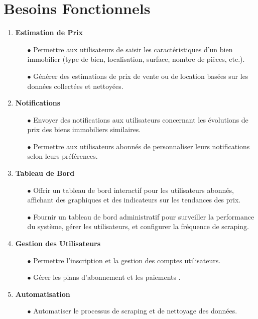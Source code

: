 \documentclass[a4paper,12pt]{report}
\numberwithin{equation}{section}
\begin{document}
\section{Besoins Fonctionnels}
\vspace{0.5cm}
\begin{enumerate}
    \item \textbf{Estimation de Prix}
    \begin{itemize}
        \item[$\bullet$] Permettre aux utilisateurs de saisir les caractéristiques d'un bien immobilier (type de bien, localisation, surface, nombre de pièces, etc.).
        \item[$\bullet$] Générer des estimations de prix de vente ou de location basées sur les données collectées et nettoyées.
    \end{itemize}
    \newpage
    \item \textbf{Notifications}
    \begin{itemize}
        \item[$\bullet$] Envoyer des notifications aux utilisateurs concernant les évolutions de prix des biens immobiliers similaires.
        \item[$\bullet$] Permettre aux utilisateurs abonnés de personnaliser leurs notifications selon leurs préférences.
    \end{itemize}
    \item \textbf{Tableau de Bord}
    \begin{itemize}
        \item[$\bullet$] Offrir un tableau de bord interactif pour les utilisateurs abonnés, affichant des graphiques et des indicateurs sur les tendances des prix.
        \item[$\bullet$] Fournir un tableau de bord administratif pour surveiller la performance du système, gérer les utilisateurs, et configurer la fréquence de scraping.
    \end{itemize}
    \item \textbf{Gestion des Utilisateurs}
    \begin{itemize}
        \item[$\bullet$] Permettre l'inscription et la gestion des comptes utilisateurs.
        \item[$\bullet$] Gérer les plans d'abonnement et les paiements .
    \end{itemize}
    \item \textbf{Automatisation }
    \begin{itemize}
        \item[$\bullet$] Automatiser le processus de scraping et de nettoyage des données.
    \end{itemize}
\end{enumerate}
\end{document}
